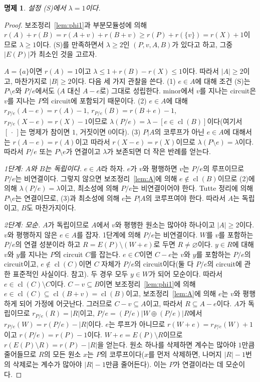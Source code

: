 \documentclass[11pt,a4paper]{article}
\theoremstyle{plain}
\newtheorem{proposition}[theorem]{명제}
\theoremstyle{definition}
\newcommand{\cl}{\operatorname{cl}}
\begin{document}
\begin{proposition}\label{prop:Q}
설정 (S)에서 $\lambda=1$이다.
\end{proposition}
\begin{proof}
보조정리~\ref{lem:phi1}과 부분모듈성에 의해 $r(A)+r(B)=r(A+v)+r(B+v)\ge r(P)+r(\{v\})=r(X)+1$이므로 $\lambda\ge1$이다. (S)를 만족하면서 $\lambda\ge2$인 $(P,v,A,B)$가 있다고 하고, 그중 $|E(P)|$가 최소인 것을 고르자.

$A=\{a\}$이면 $r(A)=1$이고 $\lambda\le1+r(B)-r(X)\le1$이다. 따라서 $|A|\ge2$이고, 마찬가지로 $|B|\ge2$이다. 다음 세 가지 관찰을 쓴다. (1) $e\in A$에 대해 조건 (S)는 $P\setminus e$와 $P/e$에서도 ($A$ 대신 $A-e$로) 그대로 성립한다. minor에서 $v$를 지나는 circuit은 $v$를 지나는 $P$의 circuit에 포함되기 때문이다. (2) $e\in A$에 대해 $r_{P/e}(A-e)=r(A)-1$, $r_{P/e}(B)=r(B+e)-1$, $r_{P/e}(X-e)=r(X)-1$이므로 $\lambda(P/e)=\lambda-[e\in\cl(B)]$이다(여기서 $[\,\cdot\,]$는 명제가 참이면 $1$, 거짓이면 $0$이다). (3) $P|A$의 코루프가 아닌 $e\in A$에 대해서는 $r(A-e)=r(A)$이고 따라서 $r(X-e)=r(X)$이므로 $\lambda(P\setminus e)=\lambda$이다. 따라서 $P/e$ 또는 $P\setminus e$가 연결이고 $\lambda$가 보존되면 더 작은 반례를 얻는다.

\emph{1단계: $A$와 $B$는 독립이다.} $e\in A$라 하자. $e$가 $v$와 평행하면 $v$는 $P/e$의 루프이므로 $P/e$는 비연결이다. 그렇지 않으면 보조정리~\ref{lem:A}에 의해 $e\notin\cl(B)$이므로 (2)에 의해 $\lambda(P/e)=\lambda$이고, 최소성에 의해 $P/e$는 비연결이어야 한다. Tutte 정리에 의해 $P\setminus e$는 연결이므로, (3)과 최소성에 의해 $e$는 $P|A$의 코루프여야 한다. 따라서 $A$는 독립이고, $B$도 마찬가지이다.

\emph{2단계: 모순.} $A$가 독립이므로 $A$에서 $v$와 평행한 원소는 많아야 하나이고 $|A|\ge2$이다. $v$와 평행하지 않은 $e\in A$를 잡자. 1단계에 의해 $P/e$는 비연결이다. $W$를 $v$를 포함하는 $P/e$의 연결 성분이라 하고 $R=E(P)\setminus(W+e)$로 두면 $R\ne\varnothing$이다. $y\in R$에 대해 $v$와 $y$를 지나는 $P$의 circuit $C$를 잡는다. $e\in C$이면 $C-e$는 $v$와 $y$를 포함하는 $P/e$의 circuit이고, $e\notin\cl(C)$이면 $C$ 자체가 $P/e$의 circuit이다(둘 다 $P/e$의 circuit에 관한 표준적인 사실이다. \cite[3장]{Ox11} 참고). 두 경우 모두 $y\in W$가 되어 모순이다. 따라서 $e\in\cl(C)\setminus C$이다. $C-v\subseteq B$이면 보조정리~\ref{lem:phi1}에 의해 $e\in\cl(C)\subseteq\cl(B+v)=\cl(B)$이고, 보조정리~\ref{lem:A}에 의해 $e$는 $v$와 평행하게 되어 가정에 어긋난다. 그러므로 $C-v\subseteq A$이고, 따라서 $R\subseteq A-e$이다. $A$가 독립이므로 $r_{P/e}(R)=|R|$이고, $P/e=(P/e)|W\oplus(P/e)|R$에서 $r_{P/e}(W)=r(P/e)-|R|$이다. $e$는 루프가 아니므로 $r(W+e)=r_{P/e}(W)+1$이고 $r(P/e)=r(P)-1$이다. $W+e=E(P)\setminus R$이므로 $r(E(P)\setminus R)=r(P)-|R|$을 얻는다. 원소 하나를 삭제하면 계수는 많아야 $1$만큼 줄어들므로 $R$의 모든 원소 $x$는 $P$의 코루프이다($x$를 먼저 삭제하면, 나머지 $|R|-1$번의 삭제로는 계수가 많아야 $|R|-1$만큼 줄어든다). 이는 $P$가 연결이라는 데 모순이다.
\end{proof}
\end{document}
